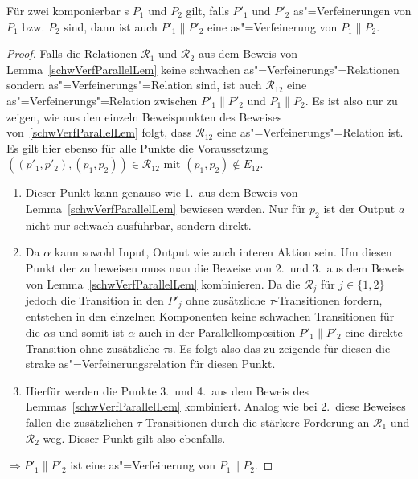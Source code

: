\begin{Kor}
  \label{verfParallelKor}
  Für zwei komponierbar \MEIO{}s $P_1$ und $P_2$ gilt, falls $P'_1$ und $P'_2$
  as"=Verfeinerungen von $P_1$ bzw. $P_2$ sind, dann ist auch $P'_1\|P'_2$ eine
  as"=Verfeinerung von $P_1\|P_2$.
\end{Kor}
\begin{proof}
  Falls die Relationen $\mathcal{R}_1$ und $\mathcal{R}_2$ aus dem Beweis von
  Lemma~\ref{schwVerfParallelLem} keine schwachen as"=Verfeinerungs"=Relationen
  sondern as"=Verfeinerungs"=Relation sind, ist auch $\mathcal{R}_{12}$ eine
  as"=Verfeinerungs"=Relation zwischen $P'_1\|P'_2$ und $P_1\|P_2$. Es ist also
  nur zu zeigen, wie aus den einzeln Beweispunkten des Beweises
  von~\ref{schwVerfParallelLem} folgt, dass $\mathcal{R}_{12}$ eine
  as"=Verfeinerungs"=Relation ist. Es gilt hier ebenso für alle Punkte die
  Voraussetzung $((p'_1,p'_2),(p_1,p_2))\in\mathcal{R}_{12}$ mit
  $(p_1,p_2)\notin E_{12}$.
  \begin{enumerate}
    \item Dieser Punkt kann genauso wie 1.\ aus dem Beweis von
      Lemma~\ref{schwVerfParallelLem} bewiesen werden. Nur für $p_2$ ist der
      Output $a$ nicht nur schwach ausführbar, sondern direkt.
    \item Da $\alpha$ kann sowohl Input, Output wie auch interen Aktion sein.
      Um diesen Punkt der zu beweisen muss man die Beweise von 2.\ und 3.\ aus
      dem Beweis von Lemma~\ref{schwVerfParallelLem} kombinieren. Da die
      $\mathcal{R}_j$ für $j\in\{1,2\}$ jedoch die Transition in den $P'_j$
      ohne zusätzliche $\tau$-Transitionen fordern, entstehen in den einzelnen
      Komponenten keine schwachen Transitionen für die $\alpha$s und somit ist
      $\alpha$ auch in der Parallelkomposition $P'_1\|P'_2$ eine direkte
      Transition ohne zusätzliche $\tau$s. Es folgt also das zu zeigende für
      diesen die strake as"=Verfeinerungsrelation für diesen Punkt.
    \item Hierfür werden die Punkte 3.\ und 4.\ aus dem Beweis des
      Lemmas~\ref{schwVerfParallelLem} kombiniert. Analog wie bei 2.\ diese
      Beweises fallen die zusätzlichen $\tau$-Transitionen durch die stärkere
      Forderung an $\mathcal{R}_1$ und $\mathcal{R}_2$ weg. Dieser Punkt gilt
      also ebenfalls.
  \end{enumerate}
  $\Rightarrow P'_1\|P'_2$ ist eine as"=Verfeinerung von $P_1\|P_2$.
\end{proof}


